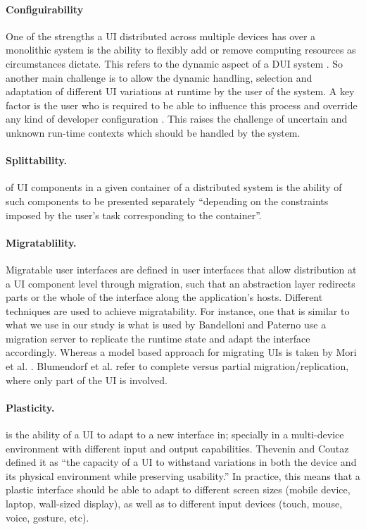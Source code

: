 \paragraph{Configuirability} 
One of the strengths a UI distributed across multiple
devices has over a monolithic system is the ability to flexibly add or remove
computing resources as circumstances dictate. This refers to the dynamic
aspect of a DUI system \cite{chen2011distributed}. So another main challenge is to allow the dynamic handling, selection and adaptation of different UI
variations at runtime by the user of the system. A key factor is the user who is
required to be able to influence this process and override any kind of developer
configuration \cite{blumendorf2011distributed}. This raises the
challenge of uncertain and unknown run-time contexts which should be handled
by the system.
\paragraph{Splittability.} of UI components in a given container of a
distributed system is the ability of such components to be presented separately ``depending on the
constraints imposed by the user’s task corresponding to the container''.\cite{demeure20084c}
\paragraph{Migratablility.} Migratable user interfaces are defined in
\cite{elmqvist2011distributed} user interfaces that allow distribution at a UI component level through migration,
such that an abstraction layer redirects parts or the whole of the interface
along the application's hosts. Different techniques are used to achieve
migratability. For instance, one that is similar to what we use in our study is
what is used by Bandelloni and Paterno \cite{bandelloni2004flexible} use a migration server to replicate
the runtime state and adapt the interface accordingly. Whereas a model based
approach for migrating UIs is taken by Mori et al. \cite{mori2004design}.
Blumendorf et al. \cite{blumendorf2011distributed} refer to complete versus
partial migration/replication, where only part of the UI is involved.
\paragraph{Plasticity.} is the ability of a UI to
adapt to a new interface in; specially in a multi-device environment with
different input and output capabilities. Thevenin and Coutaz \cite{thevenin1999plasticity} defined
it as ``the capacity of a UI to withstand variations in both the device and its physical environment while preserving usability.'' In practice, this means that a plastic interface should be able to adapt to different screen sizes (mobile device, laptop, wall-sized display), as well as to different input devices (touch, mouse, voice, gesture, etc).

